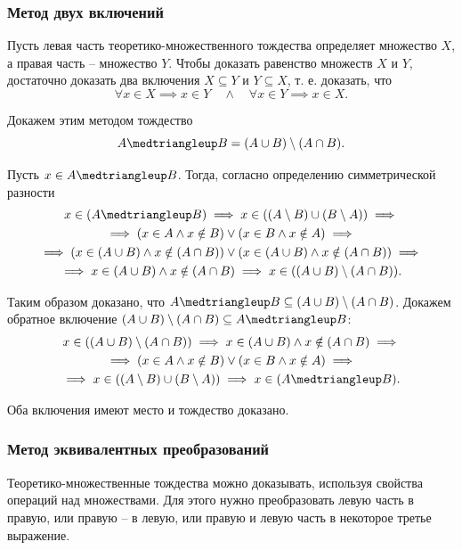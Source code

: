 \documentclass[a5paper, 11pt]{extarticle}
\theoremstyle{definition}
\theoremstyle{definition}
\theoremstyle{definition}
\numberwithin{figure}{section}
\numberwithin{table}{section}
\newcommand{\symdiff}{\medtriangleup}
\begin{document}
\subsubsection{Метод двух включений}

Пусть левая часть теоретико-множественного тождества определяет множество \(X\), а правая часть -- множество \(Y\). Чтобы доказать равенство множеств \(X\) и \(Y\), достаточно доказать два включения \(X \subseteq Y\) и \(Y \subseteq X\), т. е. доказать, что
\[
    \forall x \in X \implies x \in Y
    \quad \land \quad
    \forall x \in Y \implies x \in X.
\]

Докажем этим методом тождество
\[
    A \symdiff B = (A \cup B) \setminus (A \cap B).
\]

Пусть \(x \in A \symdiff B\). Тогда, согласно определению симметрической разности
\begin{gather*}
    x \in (A \symdiff B) \implies
    x \in ((A \setminus B) \cup (B \setminus A)) \implies \\ \implies
    (x \in A \land x \notin B) \lor (x \in B \land x \notin A) \implies \\ \implies
    (x \in (A \cup B) \land x \notin (A \cap B)) \lor (x \in (A \cup B) \land x \notin (A \cap B)) \implies \\ \implies
    x \in (A \cup B) \land x \notin (A \cap B) \implies
    x \in ((A \cup B) \setminus (A \cap B)).
\end{gather*}

Таким образом доказано, что \(A \symdiff B \subseteq (A \cup B) \setminus (A \cap B)\). Докажем обратное включение \((A \cup B) \setminus (A \cap B) \subseteq A \symdiff B\):
\begin{gather*}
    x \in ((A \cup B) \setminus (A \cap B)) \implies
    x \in (A \cup B) \land x \notin (A \cap B) \implies \\ \implies
    (x \in A \land x \notin B) \lor (x \in B \land x \notin A) \implies \\ \implies
    x \in ((A \setminus B) \cup (B \setminus A)) \implies
    x \in (A \symdiff B).
\end{gather*}

Оба включения имеют место и тождество доказано.

\subsubsection{Метод эквивалентных преобразований}

Теоретико-множественные тождества можно доказывать, используя свойства операций над множествами. Для этого нужно преобразовать левую часть в правую, или правую -- в левую, или правую и левую часть в некоторое третье выражение.
\end{document}
